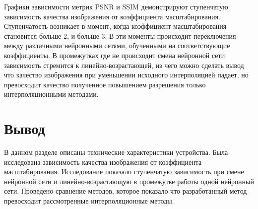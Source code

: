 Графики зависимости метрик PSNR и SSIM демонстрируют ступенчатую зависимость качества изображения от коэффициента масштабирования. Ступенчатость возникает в момент, когда коэффициент масштабирования становится больше 2, и больше 3. В эти моменты происходит переключения между различными нейронными сетями, обученными на соответствующие коэффициенты. В промежутках где не происходит смена нейронной сети зависимость стремится к линейно-возрастающей, из чего можно сделать вывод что качество изображения при уменьшении исходного интерполяцией падает, но превосходит качество полученное повышением разрешения только интерполяционными методами. 

\section*{Вывод}

В данном разделе описаны технические характеристики устройства. Была исследована зависимость качества изображения от коэффициента масштабирования. Исследование показало ступенчатую зависимость при смене нейронной сети и линейно-возрастающую в промежутке работы одной нейронный сети. Проведено сравнение методов, которое показало что разработанный метод превосходит рассмотренные интерполяционные методы. 